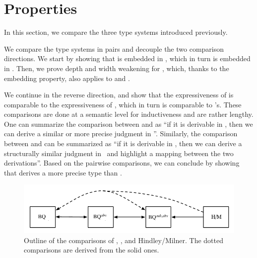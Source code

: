 \documentclass{report}
\begin{document}
  \section{Properties}
  In this section, we compare the three type systems introduced previously.
  
  We compare the type systems in pairs and decouple the two comparison directions. We start by
  showing that \BQ is embedded  in \BQa, which in turn is
  embedded in \BQsa. Then, we prove depth and width weakening for \BQsa, which, thanks to
  the embedding property, also applies to \BQ and \BQa.
  
  We continue in the reverse direction, and show that the expressiveness of \BQsa is comparable
  to the expressiveness of \BQa, which in turn is comparable to \BQ's. These comparisons are done
  at a semantic level for inductiveness and are rather lengthy. One can summarize the comparison between
  \BQsa and \BQa as ``if it is derivable in \BQsa, then we can derive a similar or more precise
  judgment in \BQa''. Similarly, the comparison between \BQa and \BQ can be summarized as
  ``if it is derivable in \BQa, then we can derive a structurally similar judgment in \BQ\ and
  highlight a mapping between the two derivations''. Based on the pairwise comparisons,
  we can conclude by showing that \BQ derives a more precise type than \BQsa {}.
  
  \begin{figure}[ht]
    \centering
    \includegraphics{images/Comparisons}
    \caption{Outline of the comparisons of \BQ, \BQa, \BQsa and Hindley/Milner. The dotted comparisons are derived from the solid ones.}
  \end{figure}
  
\end{document}

